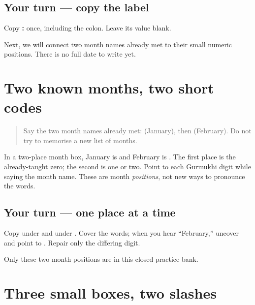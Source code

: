\subsection*{Your turn — copy the label}
Copy \textbf{:} once, including the colon. Leave its value blank.

\begin{tcolorbox}[breakable,colback=teal!4,colframe=teal!35!black,title={Before you move on}]
Next, we will connect two month names already met to their small numeric positions. There is no full date to write yet.
\end{tcolorbox}
\section[\texorpdfstring{\pa{ਜਨਵਰੀ} · \pa{ਫ਼ਰਵਰੀ} (janvarī · farvarī)}{ਜਨਵਰੀ · ਫ਼ਰਵਰੀ (janvarī · farvarī)}]{Two known months, two short codes}

\label{lesson:PA-W09-month-map}



\begin{quote}
Say the two month names already met: \textbf{} (January), then \textbf{} (February). Do not try to memorise a new list of months.
\end{quote}

\begin{grammarlens}[title={Grammar lens — month position}]
In a two-place month box, January is \textbf{} and February is \textbf{}. The first place is the already-taught zero; the second is one or two. Point to each Gurmukhi digit while saying the month name. These are month \emph{positions}, not new ways to pronounce the words.
\end{grammarlens}

\subsection*{Your turn — one place at a time}
Copy \textbf{} under  and \textbf{} under . Cover the words; when you hear “February,” uncover and point to \textbf{}. Repair only the differing digit.

\begin{tcolorbox}[breakable,colback=teal!4,colframe=teal!35!black,title={Before you move on}]
Only these two month positions are in this closed practice bank.
\end{tcolorbox}
\section[\_\_/\_\_/\_\_\_\_ (day/month/year)]{Three small boxes, two slashes}

